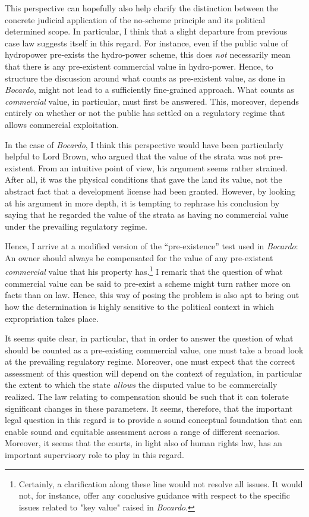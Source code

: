 This perspective can hopefully also help clarify the distinction between the concrete judicial application of the no-scheme principle and its political determined scope. In particular, I think that a slight departure from previous case law suggests itself in this regard. For instance, even if the public value of hydropower pre-exists the hydro-power scheme, this does \emph{not} necessarily mean that there is any pre-existent commercial value in hydro-power. Hence, to structure the discussion around what counts as pre-existent value, as done in {\it Bocardo}, might not lead to a sufficiently fine-grained approach.  What counts as {\it commercial} value, in particular, must first be answered. This, moreover, depends entirely on whether or not the public has settled on a regulatory regime that allows commercial exploitation.

In the case of {\it Bocardo}, I think this perspective would have been particularly helpful to Lord Brown, who argued that the value of the strata was not pre-existent. From an intuitive point of view, his argument seems rather strained. After all, it was the physical conditions that gave the land its value, not the abstract fact that a development license had been granted. However, by looking at his argument in more depth, it is tempting to rephrase his conclusion by saying that he regarded the value of the strata as having no commercial value under the prevailing regulatory regime.

Hence, I arrive at a modified version of the ``pre-existence'' test used in \emph{Bocardo}: An owner should always be compensated for the value of any pre-existent \emph{commercial} value that his property has.\footnote{Certainly, a clarification along these line would not resolve all issues. It would not, for instance, offer any conclusive guidance with respect to the specific issues related to "key value" raised in \emph{Bocardo}.} I remark that the question of what commercial value can be said to pre-exist a scheme might turn rather more on facts than on law. Hence, this way of posing the problem is also apt to bring out how the determination is highly sensitive to the political context in which expropriation takes place.

It seems quite clear, in particular, that in order to answer the question of what should be counted as a pre-existing commercial value, one must take a broad look at the prevailing regulatory regime. Moreover, one must expect that the correct assessment of this question will depend on the context of regulation, in particular the extent to which the state \emph{allows} the disputed value to be commercially realized. The law relating to compensation should be such that it can tolerate significant changes in these parameters. It  seems, therefore, that the important legal question in this regard is to provide a sound conceptual foundation that can enable sound and equitable assessment across a range of different scenarios. Moreover, it seems that the courts, in light also of human rights law, has an important supervisory role to play in this regard.

